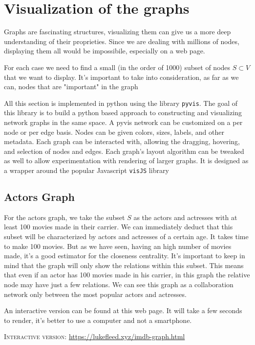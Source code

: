 \section{Visualization of the graphs} \label{Visualization of the graphs}
Graphs are fascinating structures, visualizing them can give us a more deep understanding of their proprieties. Since we are dealing with millions of nodes, displaying them all would be impossibile, especially on a web page. \s

\nd For each case we need to find a small (in the order of 1000) subset of nodes $S \subset V$ that we want to display. It's important to take into consideration, as far as we can, nodes that are "important" in the graph \s

\nd All this section is implemented in python using the library \texttt{pyvis}. The goal of this library is to build a python based approach to constructing and visualizing network graphs in the same space. A pyvis network can be customized on a per node or per edge basis. Nodes can be given colors, sizes, labels, and other metadata. Each graph can be interacted with, allowing the dragging, hovering, and selection of nodes and edges. Each graph's layout algorithm can be tweaked as well to allow experimentation with rendering of larger graphs. It is designed as a wrapper around the popular Javascript \texttt{visJS} library

\subsection{Actors Graph} \label{actors-graph-vis}
For the actors graph, we take the subset $S$ as the actors and actresses with at least 100 movies made in their carrier. We can immediately deduct that this subset will be characterized by actors and actresses of a certain age. It takes time to make 100 movies. But as we have seen, having an high number of movies made, it's a good estimator for the closeness centrality. It's important to keep in mind that the graph will only show the relations within this subset. This means that even if an actor has 100 movies made in his carrier, in this graph the relative node may have just a few relations. We can see this graph as a collaboration network only between the most popular actors and actresses. \s

\nd An interactive version can be found at this web page. It will take a few seconds to render, it's better to use a computer and not a smartphone. \s

\textsc{Interactive version}: \url{https://lukefleed.xyz/imdb-graph.html}

